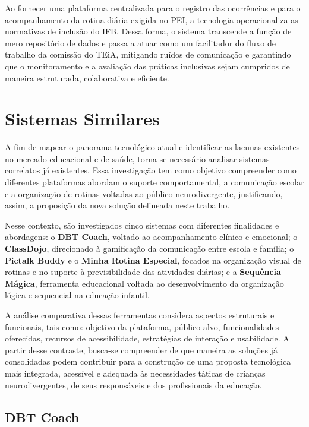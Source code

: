 Ao fornecer uma plataforma centralizada para o registro das ocorrências e para o acompanhamento da rotina diária exigida no PEI, a tecnologia operacionaliza as normativas de inclusão do IFB. Dessa forma, o sistema transcende a função de mero repositório de dados e passa a atuar como um facilitador do fluxo de trabalho da comissão do TEiA, mitigando ruídos de comunicação e garantindo que o monitoramento e a avaliação das práticas inclusivas sejam cumpridos de maneira estruturada, colaborativa e eficiente.

\section{Sistemas Similares}

A fim de mapear o panorama tecnológico atual e identificar as lacunas existentes no mercado educacional e de saúde, torna-se necessário analisar sistemas correlatos já existentes. Essa investigação tem como objetivo compreender como diferentes plataformas abordam o suporte comportamental, a comunicação escolar e a organização de rotinas voltadas ao público neurodivergente, justificando, assim, a proposição da nova solução delineada neste trabalho.

Nesse contexto, são investigados cinco sistemas com diferentes finalidades e abordagens: o \textbf{DBT Coach}, voltado ao acompanhamento clínico e emocional; o \textbf{ClassDojo}, direcionado à gamificação da comunicação entre escola e família; o \textbf{Pictalk Buddy} e o \textbf{Minha Rotina Especial}, focados na organização visual de rotinas e no suporte à previsibilidade das atividades diárias; e a \textbf{Sequência Mágica}, ferramenta educacional voltada ao desenvolvimento da organização lógica e sequencial na educação infantil.

A análise comparativa dessas ferramentas considera aspectos estruturais e funcionais, tais como: objetivo da plataforma, público-alvo, funcionalidades oferecidas, recursos de acessibilidade, estratégias de interação e usabilidade. A partir desse contraste, busca-se compreender de que maneira as soluções já consolidadas podem contribuir para a construção de uma proposta tecnológica mais integrada, acessível e adequada às necessidades táticas de crianças neurodivergentes, de seus responsáveis e dos profissionais da educação.

\vspace{0.3cm}
\subsection{DBT Coach}

